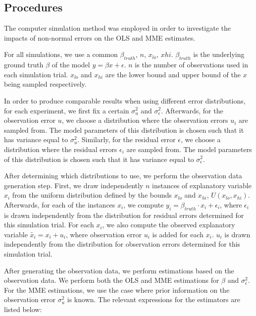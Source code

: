 \documentclass{article}
\begin{document}
\subsection{Procedures}

The computer simulation method was employed in order to investigate the impacts of non-normal errors on the OLS and MME estimates.

For all simulations, we use a common $\beta_{truth}$, $n$, $x_{lo}$, $x{hi}$. $\beta_{truth}$ is the underlying ground truth $\beta$ of the model $y=\beta x + \epsilon$. $n$ is the number of observations used in each simulation trial. $x_{lo}$ and $x_{hi}$ are the lower bound and upper bound of the $x$ being sampled respectively.

In order to produce comparable results when using different error distributions, for each experiment, we first fix a certain $\sigma^2_u$ and $\sigma^2_\epsilon$.
Afterwards, for the observation error $u$, we choose a distribution where the observation errors $u_i$ are sampled from.
The model parameters of this distribution is chosen such that it has variance equal to $\sigma_u^2$.
Similarly, for the residual error $\epsilon$, we choose a distribution where the residual errors $\epsilon_i$ are sampled from.
The model parameters of this distribution is chosen such that it has variance equal to $\sigma_\epsilon^2$.

After determining which distributions to use, we perform the observation data generation step. First, we draw independently $n$ instances of explanatory variable $x_i$ from the uniform distribution defined by the bounds $x_{lo}$ and $x_{hi}$, $U(x_{lo}, x_{hi})$.
Afterwards, for each of the instances $x_i$, we compute $y_i = \beta_{truth} \cdot x_i + \epsilon_i$, where $\epsilon_i$ is drawn independently from the distribution for residual errors determined for this simulation trial.
For each $x_i$, we also compute the observed explanatory variable $\tilde{x_i} = x_i + u_i$, where observation error $u_i$ is added for each $x_i$. $u_i$ is drawn independently from the distribution for observation errors determined for this simulation trial.

After generating the observation data, we perform estimations based on the observation data. We perform both the OLS and MME estimations for $\beta$ and $\sigma_\epsilon^2$. For the MME estimations, we use the case where prior information on the observation error $\sigma_u^2$ is known. The relevant expressions for the estimators are listed below:
\end{document}
